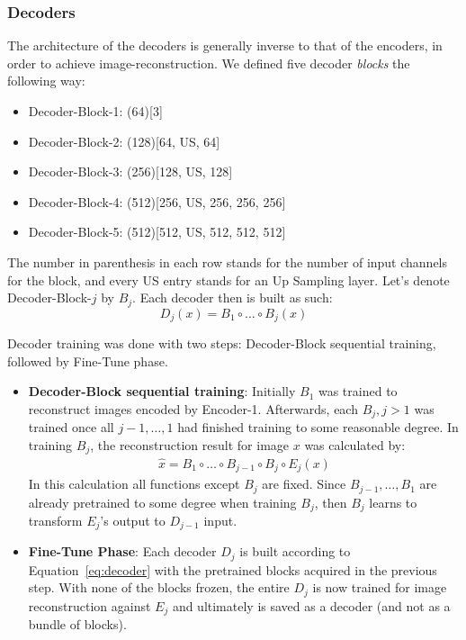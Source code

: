 \subsubsection{Decoders}
The architecture of the decoders is generally inverse to that of the encoders, in order to achieve image-reconstruction. We defined five decoder \textit{blocks} the following way:
\begin{itemize}
	\item Decoder-Block-1: (64)[3]
	\item Decoder-Block-2: (128)[64, US, 64]
	\item Decoder-Block-3: (256)[128, US, 128]
	\item Decoder-Block-4: (512)[256, US, 256, 256, 256]
	\item Decoder-Block-5: (512)[512, US, 512, 512, 512]
\end{itemize}
The number in parenthesis in each row stands for the number of input channels for the block, and every US entry stands for an Up Sampling layer. Let's denote Decoder-Block-$j$ by $B_j$. Each decoder then is built as such:
\begin{equation}\label{eq:decoder}
	D_j(x) = B_1 \circ \dots \circ B_j (x)
\end{equation}

Decoder training was done with two steps: Decoder-Block sequential training, followed by Fine-Tune phase.
\begin{itemize}
	\item \textbf{Decoder-Block sequential training}: Initially $B_1$ was trained to reconstruct images encoded by Encoder-1. Afterwards, each $B_j, j>1$ was trained once all $j-1,\dots,1$ had finished training to some reasonable degree. In training $B_j$, the reconstruction result for image $x$ was calculated by:
	\begin{gather*}
	\hat{x} = B_1 \circ \dots \circ B_{j-1} \circ B_j \circ E_j (x)
	\end{gather*}
	In this calculation all functions except $B_j$ are fixed. Since $B_{j-1}, \dots, B_1$ are already pretrained to some degree when training $B_j$, then $B_j$ learns to transform $E_j$'s output to $D_{j-1}$ input.
	
	\item \textbf{Fine-Tune Phase}: Each decoder $D_j$ is built according to Equation~\ref*{eq:decoder} with the pretrained blocks acquired in the previous step. With none of the blocks frozen, the entire $D_j$ is now trained for image reconstruction against $E_j$ and ultimately is saved as a decoder (and not as a bundle of blocks).
\end{itemize}


